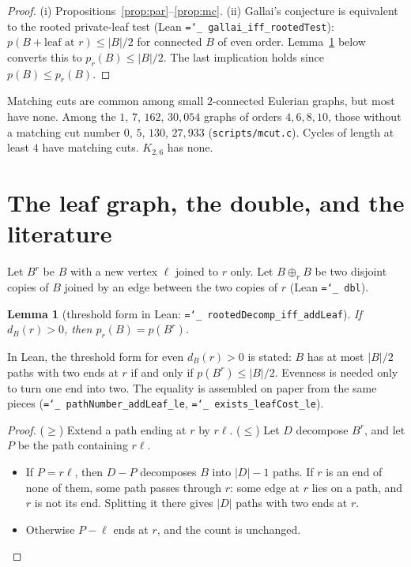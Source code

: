 \documentclass[11pt]{amsart}
\newtheorem{lemma}[theorem]{Lemma}
\theoremstyle{definition}
\newcommand{\pr}{p_r}
\newcommand{\lean}[1]{\texttt{\hyphenchar\font=`\_ #1}}
\begin{document}
\begin{proof}
(i) Propositions~\ref{prop:par}--\ref{prop:mc}. (ii) Gallai's conjecture is equivalent to the rooted
private-leaf test (Lean \lean{gallai\_iff\_rootedTest}): $p(B+\text{leaf at } r)\le|B|/2$ for
connected $B$ of even order. Lemma~\ref{lem:leaf} below converts this to $\pr(B)\le |B|/2$. The last
implication holds since $p(B)\le\pr(B)$.
\end{proof}

Matching cuts are common among small $2$-connected Eulerian graphs, but most have none. Among the $1$,
$7$, $162$, $30{,}054$ graphs of orders $4,6,8,10$, those without a matching cut number $0$, $5$,
$130$, $27{,}933$ (\texttt{scripts/mcut.c}). Cycles of length at least $4$ have matching cuts. $K_{2,6}$
has none.

\section{The leaf graph, the double, and the literature}\label{sec:lit}

Let $B^r$ be $B$ with a new vertex $\ell$ joined to $r$ only. Let $B\oplus_r B$ be two disjoint copies
of $B$ joined by an edge between the two copies of $r$ (Lean \lean{dbl}).

\begin{lemma}[threshold form in Lean: \lean{rootedDecomp\_iff\_addLeaf}]\label{lem:leaf}
If $d_B(r)>0$, then $\pr(B)=p(B^r)$.
\end{lemma}
In Lean, the threshold form for even $d_B(r)>0$ is stated: $B$ has at most $|B|/2$ paths with two ends at
$r$ if and only if $p(B^r)\le|B|/2$. Evenness is needed only to turn one end into two. The
equality is assembled on paper from the same pieces (\lean{pathNumber\_addLeaf\_le},
\lean{exists\_leafCost\_le}).

\begin{proof}
($\ge$) Extend a path ending at $r$ by $r\ell$.
($\le$) Let $D$ decompose $B^r$, and let $P$ be the path containing $r\ell$.
\begin{itemize}[leftmargin=*]
\item If $P=r\ell$, then $D-P$ decomposes $B$ into $|D|-1$ paths. If $r$ is an end of none of them, some
path passes through $r$: some edge at $r$ lies on a path, and $r$ is not its end. Splitting it there gives $|D|$
paths with two ends at $r$.
\item Otherwise $P-\ell$ ends at $r$, and the count is unchanged.
\end{itemize}
\end{proof}
\end{document}
